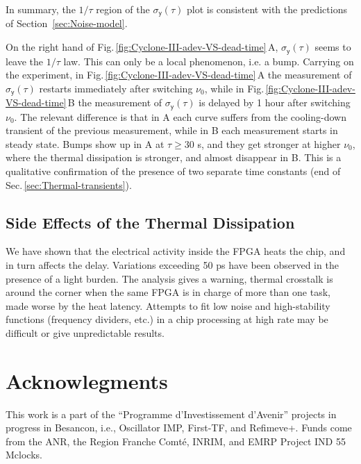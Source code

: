 \documentclass{article}
\begin{document}
In summary, the $1/\tau$ region of the $\sigma_\mathsf{y}(\tau)$ plot is consistent with the predictions of Section~\ref{sec:Noise-model}.

On the right hand of Fig.\,\ref{fig:Cyclone-III-adev-VS-dead-time}\,A, $\sigma_\mathsf{y}(\tau)$ seems to leave the $1/\tau$ law.  This can only be a local phenomenon, i.e. a bump.
Carrying on the experiment, in Fig.\,\ref{fig:Cyclone-III-adev-VS-dead-time}\,A the measurement of $\sigma_\mathsf{y}(\tau)$ restarts immediately after switching $\nu_0$, while in Fig.\,\ref{fig:Cyclone-III-adev-VS-dead-time}\,B the measurement of $\sigma_\mathsf{y}(\tau)$ is delayed by 1 hour after switching $\nu_0$.  
The relevant difference is that in A each curve suffers from the cooling-down transient of the previous measurement, while in B each measurement starts in steady state.
Bumps show up in A at $\tau\ge30$ s, and they get stronger at higher $\nu_0$, where the thermal dissipation is stronger, and almost disappear in B\@.  This is a qualitative confirmation of the presence of two separate time constants (end of Sec.\,\ref{sec:Thermal-transients}).



\subsection{Side Effects of the Thermal Dissipation}
We have shown that the electrical activity inside the FPGA heats the chip, and in turn affects the delay.  Variations exceeding 50 ps have been observed in the presence of a light burden.    
The analysis gives a warning, thermal crosstalk is around the corner when the same FPGA is in charge of more than one task, made worse by the heat latency. 
Attempts to fit low noise and high-stability functions (frequency dividers, etc.) in a chip processing at high rate may be difficult or give unpredictable results. 




\section*{Acknowlegments}\label{sec:Acknow}
This work is a part of the ``Programme d'Investissement d'Avenir'' projects in progress in Besancon, i.e., Oscillator IMP, First-TF, and Refimeve+.  Funds come from the ANR, the Region Franche Comt\'{e}, INRIM, and EMRP Project IND 55 Mclocks.  
\end{document}
